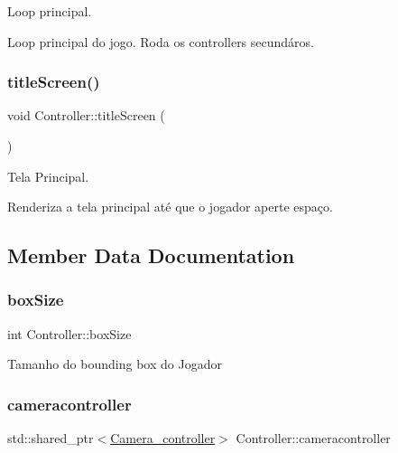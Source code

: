 Loop principal. 

Loop principal do jogo. Roda os controllers secundáros. \mbox{\label{classController_a18960c9e5f51f4844d51d27fb394ff85}} 
\subsubsection{\texorpdfstring{title\+Screen()}{titleScreen()}}
{\footnotesize\ttfamily void Controller\+::title\+Screen (\begin{DoxyParamCaption}{ }\end{DoxyParamCaption})}



Tela Principal. 

Renderiza a tela principal até que o jogador aperte espaço. 

\subsection{Member Data Documentation}
\mbox{\label{classController_afdb6115d8bbca2eb32d253e66ee0b105}} 
\subsubsection{\texorpdfstring{box\+Size}{boxSize}}
{\footnotesize\ttfamily int Controller\+::box\+Size\hspace{0.3cm}{\ttfamily [private]}}

Tamanho do bounding box do Jogador \mbox{\label{classController_a0fff98a80ea67c6c500d4f06f0d11995}} 
\subsubsection{\texorpdfstring{cameracontroller}{cameracontroller}}
{\footnotesize\ttfamily std\+::shared\+\_\+ptr$<$\hyperlink{classCamera__controller}{Camera\+\_\+controller}$>$ Controller\+::cameracontroller\hspace{0.3cm}{\ttfamily [private]}}

